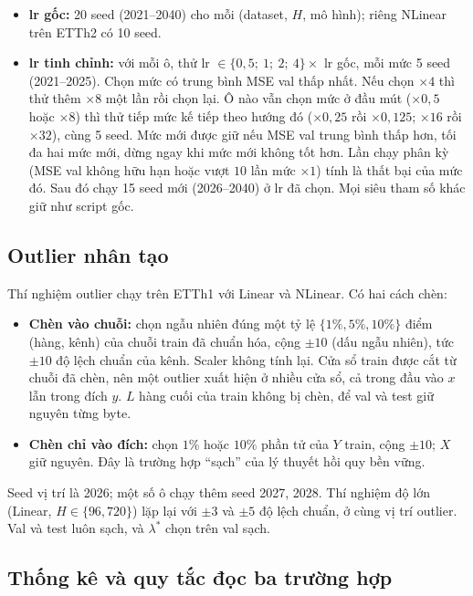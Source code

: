 \begin{itemize}
    \item \textbf{lr gốc:} 20 seed (2021--2040) cho mỗi (dataset, $H$, mô hình); riêng NLinear trên ETTh2 có 10 seed.
    \item \textbf{lr tinh chỉnh:} với mỗi ô, thử lr $\in \{0{,}5;\ 1;\ 2;\ 4\} \times$ lr gốc, mỗi mức 5 seed (2021--2025). Chọn mức có trung bình MSE val thấp nhất. Nếu chọn $\times 4$ thì thử thêm $\times 8$ một lần rồi chọn lại. Ô nào vẫn chọn mức ở đầu mút ($\times 0{,}5$ hoặc $\times 8$) thì thử tiếp mức kế tiếp theo hướng đó ($\times 0{,}25$ rồi $\times 0{,}125$; $\times 16$ rồi $\times 32$), cùng 5 seed. Mức mới được giữ nếu MSE val trung bình thấp hơn, tối đa hai mức mới, dừng ngay khi mức mới không tốt hơn. Lần chạy phân kỳ (MSE val không hữu hạn hoặc vượt $10$ lần mức $\times 1$) tính là thất bại của mức đó. Sau đó chạy 15 seed mới (2026--2040) ở lr đã chọn. Mọi siêu tham số khác giữ như script gốc.
\end{itemize}

\subsection{Outlier nhân tạo}
\label{sec:method-outliers}

Thí nghiệm outlier chạy trên ETTh1 với Linear và NLinear. Có hai cách chèn:
\begin{itemize}
    \item \textbf{Chèn vào chuỗi:} chọn ngẫu nhiên đúng một tỷ lệ $\{1\%, 5\%, 10\%\}$ điểm (hàng, kênh) của chuỗi train đã chuẩn hóa, cộng $\pm 10$ (dấu ngẫu nhiên), tức $\pm 10$ độ lệch chuẩn của kênh. Scaler không tính lại. Cửa sổ train được cắt từ chuỗi đã chèn, nên một outlier xuất hiện ở nhiều cửa sổ, cả trong đầu vào $x$ lẫn trong đích $y$. $L$ hàng cuối của train không bị chèn, để val và test giữ nguyên từng byte.
    \item \textbf{Chèn chỉ vào đích:} chọn $1\%$ hoặc $10\%$ phần tử của $Y$ train, cộng $\pm 10$; $X$ giữ nguyên. Đây là trường hợp ``sạch'' của lý thuyết hồi quy bền vững.
\end{itemize}
Seed vị trí là 2026; một số ô chạy thêm seed 2027, 2028. Thí nghiệm độ lớn (Linear, $H \in \{96, 720\}$) lặp lại với $\pm 3$ và $\pm 5$ độ lệch chuẩn, ở cùng vị trí outlier. Val và test luôn sạch, và $\lambda^*$ chọn trên val sạch.

\subsection{Thống kê và quy tắc đọc ba trường hợp}
\label{sec:method-stats}

